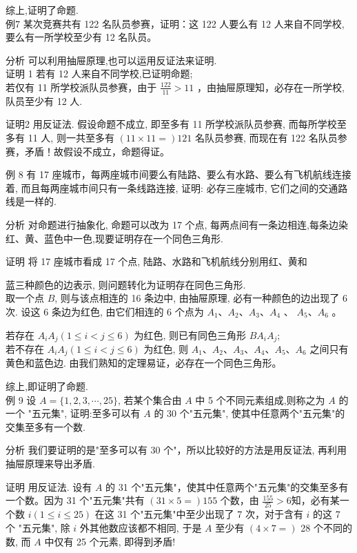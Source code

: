 \documentclass[10pt]{article}
\begin{document}
综上,证明了命题.\\
例7 某次竞赛共有 122 名队员参赛，证明：这 122 人要么有 12 人来自不同学校, 要么有一所学校至少有 12 名队员。

分析 可以利用抽屉原理,也可以运用反证法来证明.\\
证明 1 若有 12 人来自不同学校,已证明命题;\\
若仅有 11 所学校派队员参赛，由于 $\frac{122}{11}>11$ ，由抽屉原理知，必存在一所学校,队员至少有 12 人.

证明2 用反证法. 假设命题不成立, 即至多有 11 所学校派队员参赛, 而每所学校至多有 11 人, 则一共至多有 $(11 \times 11=) 121$ 名队员参赛, 而现在有 122 名队员参赛，矛盾！故假设不成立，命题得证。

例 8 有 17 座城市，每两座城市间要么有陆路、要么有水路、要么有飞机航线连接着, 而且每两座城市间只有一条线路连接, 证明: 必存三座城市, 它们之间的交通路线是一样的.

分析 对命题进行抽象化, 命题可以改为 17 个点, 每两点间有一条边相连,每条边染红、黄、蓝色中一色,现要证明存在一个同色三角形.

证明 将 17 座城市看成 17 个点, 陆路、水路和飞机航线分别用红、黄和

蓝三种颜色的边表示, 则问题转化为证明存在同色三角形.\\
取一个点 $B$, 则与该点相连的 16 条边中, 由抽屉原理, 必有一种颜色的边出现了 6 次. 设这 6 条边为红色, 由它们相连的 6 个点为 $A_{1} 、 A_{2} 、 A_{3} 、 A_{4}$ 、 $A_{5} 、 A_{6}$ 。

若存在 $A_{i} A_{j}(1 \leqslant i<j \leqslant 6)$ 为红色, 则已有同色三角形 $B A_{i} A_{j}$;\\
若不存在 $A_{i} A_{j}(1 \leqslant i<j \leqslant 6)$ 为红色, 则 $A_{1} 、 A_{2} 、 A_{3} 、 A_{4} 、 A_{5} 、 A_{6}$ 之间只有黄色和蓝色边. 由我们熟知的定理易证，必存在一个同色三角形。

综上,即证明了命题.\\
例 9 设 $A=\{1,2,3, \cdots, 25\}$, 若某个集合由 $A$ 中 5 个不同元素组成,则称之为 $A$ 的一个 "五元集", 证明:至多可以有 $A$ 的 30 个"五元集", 使其中任意两个"五元集"的交集至多有一个数.

分析 我们要证明的是"至多可以有 30 个"，所以比较好的方法是用反证法, 再利用抽屉原理来导出矛盾.

证明 用反证法. 设有 $A$ 的 31 个"五元集"，使其中任意两个"五元集"的交集至多有一个数。因为 31 个"五元集"共有 $(31 \times 5=) 155$ 个数，由 $\frac{155}{25}>6$知，必有某一个数 $i(1 \leqslant i \leqslant 25)$ 在这 31 个"五元集"中至少出现了 7 次，对于含有 $i$ 的这 7 个 "五元集", 除 $i$ 外其他数应该都不相同, 于是 $A$ 至少有 $(4 \times 7=)$ 28 个不同的数, 而 $A$ 中仅有 25 个元素, 即得到矛盾!
\end{document}
